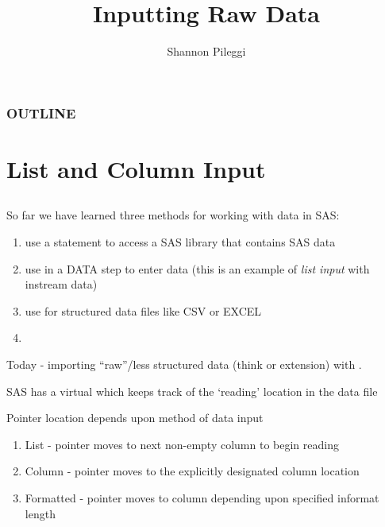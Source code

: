 





\title[Lecture 18]{Inputting Raw Data}
\author[Pileggi]{Shannon Pileggi}


\date{}




\begin{frame}
\titlepage
\end{frame}

\begin{frame}
\frametitle{OUTLINE\qquad\qquad\qquad} \tableofcontents[hideallsubsections]
\end{frame}

\section[List and Column Input]{List and Column Input}
\subsection{}
\begin{frame}
So far we have learned three methods for working with data in SAS:
\begin{enumerate}
\item use a  statement to access a SAS library that contains SAS data
\item use  in a DATA step to enter data (this is an example of \emph{list input} with instream data)
\item use  for structured data files like CSV or EXCEL
\item[]
\end{enumerate}
Today - importing ``raw''/less structured data (think  or  extension) with .
\vskip5pt
\end{frame}

\begin{frame}
\bi
\item SAS has a virtual  which keeps track of the `reading' location in the data file
\item Pointer location depends upon method of data input
\begin{enumerate}
\item List - pointer moves to next non-empty column to begin reading
\item Column - pointer moves to the explicitly designated column location
\item Formatted - pointer moves to column depending upon specified informat length
\end{enumerate}
\ei
\end{frame}


